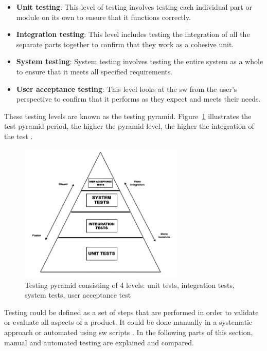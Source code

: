 \begin{itemize}
    \item \textbf{Unit testing}: This level of testing involves testing each individual part or module on its own to ensure that it functions correctly.
    \item \textbf{Integration testing}: This level includes testing the integration of all the separate parts together to confirm that they work as a cohesive unit.
    \item \textbf{System testing}: System testing involves testing the entire system as a whole to ensure that it meets all specified requirements.
    \item \textbf{User acceptance testing}: This level looks at the \gls{sw} from the user's perspective to confirm that it performs as they expect and meets their needs.
\end{itemize}

These testing levels are known as the testing pyramid. Figure~\ref{TP} illustrates the test pyramid period, the higher the pyramid level, the higher the integration of the test \cite{leloudas2023}.

\begin{figure}[ht]
    \centering
    \includegraphics[width=0.7\textwidth]{Figures/Testing_triangle.png}  %
    \caption{Testing pyramid consisting of 4 levels: unit tests, integration tests, system tests, user acceptance test \cite{leloudas2023}}
    \label{TP}
\end{figure}

Testing could be defined as a set of steps that are performed in order to validate or evaluate all aspects of a product. It could be done manually in a systematic approach or automated using \gls{sw} scripts \cite{shiwangi2014}. In the following parts of this section, manual and automated testing are explained and compared.


